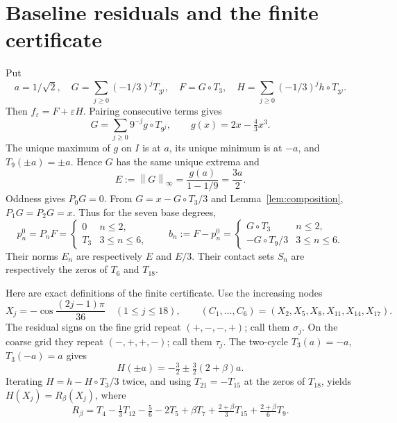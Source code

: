\documentclass[11pt]{article}
\theoremstyle{remark}\newtheorem{remark}[theorem]{Remark}
\newcommand{\norm}[1]{\left\lVert #1\right\rVert_\infty}
\begin{document}
\section{Baseline residuals and the finite certificate}
Put
\[
 a=1/\sqrt2,\quad
 G=\sum_{j\ge0}(-1/3)^j T_{3^j},\quad F=G\circ T_3,\quad
 H=\sum_{j\ge0}(-1/3)^j h\circ T_{3^j}.
\]
Then $f_\varepsilon=F+\varepsilon H$. Pairing consecutive terms gives
\[
 G=\sum_{j\ge0}9^{-j}g\circ T_{9^j},\qquad
 g(x)=2x-\tfrac43x^3.
\]
The unique maximum of $g$ on $I$ is at $a$, its unique minimum is at $-a$,
and $T_9(\pm a)=\pm a$. Hence $G$ has the same unique extrema and
\[
 E:=\norm G=\frac{g(a)}{1-1/9}=\frac{3a}{2}.
\]
Oddness gives $P_0G=0$. From $G=x-G\circ T_3/3$ and
Lemma~\ref{lem:composition}, $P_1G=P_2G=x$. Thus for the seven base degrees,
\begin{equation}\label{origin:eq:baseline}
 p_n^0=P_nF=\begin{cases}0&n\le2,\\ T_3&3\le n\le6,\end{cases}
 \qquad b_n:=F-p_n^0=
 \begin{cases}G\circ T_3&n\le2,\\-G\circ T_9/3&3\le n\le6.\end{cases}
\end{equation}
Their norms $E_n$ are respectively $E$ and $E/3$. Their contact sets $S_n$
are respectively the zeros of $T_6$ and $T_{18}$.

Here are exact definitions of the finite certificate. Use the increasing nodes
\[
 X_j=-\cos\frac{(2j-1)\pi}{36}\quad(1\le j\le18),\qquad
 (C_1,\ldots,C_6)=(X_2,X_5,X_8,X_{11},X_{14},X_{17}).
\]
The residual signs on the fine grid repeat $(+,-,-,+)$; call them $\sigma_j$.
On the coarse grid they repeat $(-,+,+,-)$; call them $\tau_j$.
The two-cycle $T_3(a)=-a$, $T_3(-a)=a$ gives
\[
 H(\pm a)=-\tfrac32\pm\tfrac32(2+\beta)a.
\]
Iterating $H=h-H\circ T_3/3$ twice, and using $T_{21}=-T_{15}$ at the
zeros of $T_{18}$, yields $H(X_j)=R_\beta(X_j)$, where
\begin{equation}\label{origin:eq:gridvalue}
 R_\beta=T_4-\tfrac13T_{12}-\tfrac56-2T_5+\beta T_7
                +\tfrac{2+\beta}{3}T_{15}+\tfrac{2+\beta}{6}T_9.
\end{equation}
\end{document}
